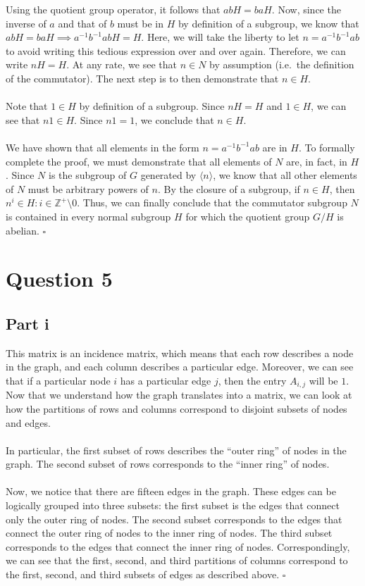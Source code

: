 \documentclass[letterpaper]{article}
\newcommand*{\QED}{\hfill\ensuremath{\square}}%
\begin{document}
Using the quotient group operator, it follows that $ abH = baH $.
Now, since the inverse of $ a $ and that of $ b $ must be in $ H $ by definition of a subgroup, we know that $ abH = baH \implies a^{-1}b^{-1}abH = H $.
Here, we will take the liberty to let $ n = a^{-1}b^{-1}ab $ to avoid writing this tedious expression over and over again.
Therefore, we can write $ nH = H $.
At any rate, we see that $ n \in N $ by assumption (i.e.\ the definition of the commutator).
The next step is to then demonstrate that $ n \in H $.
\\ \\
Note that $ 1 \in H $ by definition of a subgroup.
Since $ nH = H $ and $ 1 \in H $, we can see that $ n1 \in H $.
Since $ n1 = 1 $, we conclude that $ n \in H $.
\\ \\
We have shown that all elements in the form $ n = a^{-1}b^{-1}ab $ are in $ H $.
To formally complete the proof, we must demonstrate that all elements of $ N $ are, in fact, in $ H $.
Since $ N $ is the subgroup of $ G $ generated by $ \langle n \rangle $, we know that all other elements of $ N $ must be arbitrary powers of $ n $.
By the closure of a subgroup, if $ n \in H $, then $ n^i \in H : i \in \mathbb{Z}^{+} \setminus 0 $.
Thus, we can finally conclude that the commutator subgroup $ N $ is contained in every normal subgroup $ H $ for which the quotient group $ G / H $ is abelian.
\QED{}

\section{Question 5}
\label{sec:Question5}

\subsection{Part i}
\label{sub:5Parti}

This matrix is an incidence matrix, which means that each row describes a node in the graph, and each column describes a particular edge.
Moreover, we can see that if a particular node $ i $ has a particular edge $ j $, then the entry $ A_{i, j} $ will be $ 1 $.
Now that we understand how the graph translates into a matrix, we can look at how the partitions of rows and columns correspond to disjoint subsets of nodes and edges.
\\ \\
In particular, the first subset of rows describes the ``outer ring'' of nodes in the graph.
The second subset of rows corresponds to the ``inner ring'' of nodes.
\\ \\
Now, we notice that there are fifteen edges in the graph.
These edges can be logically grouped into three subsets: the first subset is the edges that connect only the outer ring of nodes.
The second subset corresponds to the edges that connect the outer ring of nodes to the inner ring of nodes.
The third subset corresponds to the edges that connect the inner ring of nodes.
Correspondingly, we can see that the first, second, and third partitions of columns correspond to the first, second, and third subsets of edges as described above.
\QED{}
\end{document}
